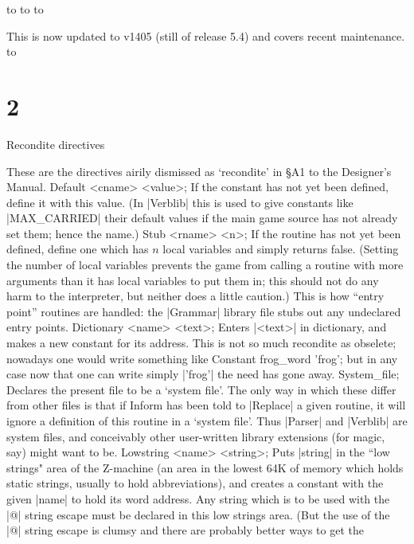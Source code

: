 \medskip
\hbox to
\hbox to
\hbox to
\medskip

This is now updated to v1405 (still of release 5.4) and covers recent
maintenance.
\medskip
\hbox to
\ninepoint

\section{2}{Recondite directives}

These are the directives airily dismissed as `recondite' in \S A1 to the
Designer's Manual.
\beginstt
Default <cname> <value>;
\endtt
If the constant has not yet been defined, define it with this value.
(In |Verblib| this is used to give constants like |MAX_CARRIED| their
default values if the main game source has not already set them;
hence the name.)
\beginstt
Stub <rname> <n>;
\endtt
If the routine has not yet been defined, define one which has $n$ local
variables and simply returns false.  (Setting the number of local variables
prevents the game from calling a routine with more arguments than it has
local variables to put them in; this should not do any harm to the
interpreter, but neither does a little caution.)  This is how ``entry
point'' routines are handled: the |Grammar| library file stubs out any
undeclared entry points.
\beginstt
Dictionary <name> <text>;
\endtt
Enters |<text>| in dictionary, and makes a new constant for its address.
This is not so much recondite as obselete; nowadays one would write
something like
\beginstt
Constant frog_word 'frog';
\endtt
but in any case now that one can write simply |'frog'| the need has gone
away.
\beginstt
System_file;
\endtt
Declares the present file to be a `system file'.  The only way in which
these differ from other files is that if Inform has been told to |Replace|
a given routine, it will ignore a definition of this routine in a `system
file'.  Thus |Parser| and |Verblib| are system files, and conceivably
other user-written library extensions (for magic, say) might want to be.
\beginstt
Lowstring <name> <string>;
\endtt
Puts |string| in the ``low strings" area of the Z-machine (an area in the
lowest 64K of memory which holds static strings, usually to hold
abbreviations), and creates a constant with the given |name| to hold its
word address.  Any string which is to be used with the |@| string escape
must be declared in this low strings area.  (But the use of the |@|
string escape is clumsy and there are probably better ways to get the
